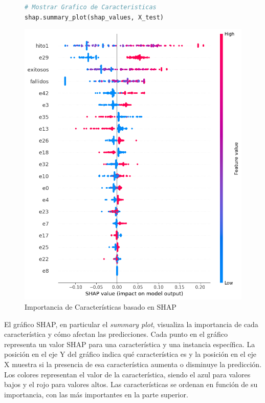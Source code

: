 \begin{figure}[H]
    \centering
    \begin{minipage}{0.48\textwidth}
        \begin{lstlisting}[language=Python, caption=Grafico de Caracteristicas, label=lst:graf_caracteristicas]
# Mostrar Grafico de Caracteristicas
shap.summary_plot(shap_values, X_test)
        \end{lstlisting}
    \end{minipage}
    \hfill
    \begin{minipage}{0.48\textwidth}
        \centering
        \includegraphics[width=0.9\linewidth]{img/shap_rf/shapForcePlot2.png}
        \caption{Importancia de Características basado en SHAP}
        \label{fig:caract_var_shap}
    \end{minipage}
\end{figure}

El gráfico SHAP, en particular el \textit{summary plot}, visualiza la importancia de cada característica y cómo afectan las predicciones. Cada punto en el gráfico representa un valor SHAP para una característica y una instancia específica. La posición en el eje Y del gráfico indica qué característica es y la posición en el eje X muestra si la presencia de esa característica aumenta o disminuye la predicción. Los colores representan el valor de la característica, siendo el azul para valores bajos y el rojo para valores altos. Las características se ordenan en función de su importancia, con las más importantes en la parte superior.

